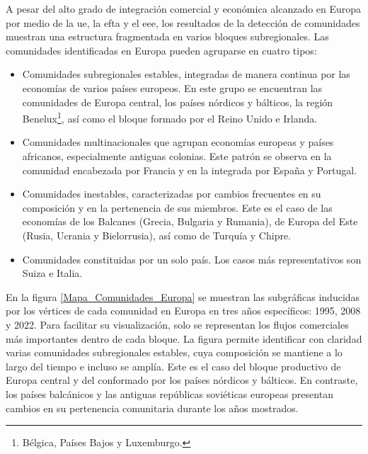 A pesar del alto grado de integración comercial y económica alcanzado en Europa por medio de la \gls{ue}, la \gls{efta} y el \gls{eee}, los resultados de la detección de comunidades muestran una estructura fragmentada en varios bloques subregionales. Las comunidades identificadas en Europa pueden agruparse en cuatro tipos:
\begin{itemize}
	\item Comunidades subregionales estables, integradas de manera continua por las economías de varios países europeos. En este grupo se encuentran las comunidades de Europa central, los países nórdicos y bálticos, la región Benelux\footnote{Bélgica, Países Bajos y Luxemburgo.}, así como el bloque formado por el Reino Unido e Irlanda. 
	\item Comunidades multinacionales que agrupan economías europeas y países africanos, especialmente antiguas colonias. Este patrón se observa en la comunidad encabezada por Francia y en la integrada por España y Portugal.
	\item Comunidades inestables, caracterizadas por cambios frecuentes en su composición y en la pertenencia de sus miembros. Este es el caso de las economías de los Balcanes (Grecia, Bulgaria y Rumania), de Europa del Este (Rusia, Ucrania y Bielorrusia), así como de Turquía y Chipre.
	\item Comunidades constituidas por un solo país. Los casos más representativos son Suiza e Italia.
\end{itemize}
En la figura \ref{Mapa_Comunidades_Europa} se muestran las subgráficas inducidas por los vértices de cada comunidad en Europa en tres años específicos: 1995, 2008 y 2022. Para facilitar su visualización, solo se representan los flujos comerciales más importantes dentro de cada bloque. La figura permite identificar con claridad varias comunidades subregionales estables, cuya composición se mantiene a lo largo del tiempo e incluso se amplía. Este es el caso del bloque productivo de Europa central y del conformado por los países nórdicos y bálticos. En contraste, los países balcánicos y las antiguas repúblicas soviéticas europeas presentan cambios en su pertenencia comunitaria durante los años mostrados.

